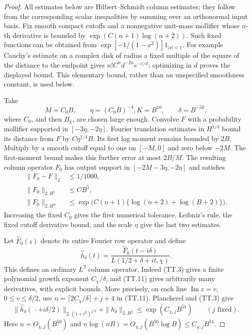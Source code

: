 \begin{proof}
All estimates below are Hilbert--Schmidt column estimates;
they follow from the corresponding scalar inequalities by
summing over an orthonormal input basis.
Fix smooth compact cutoffs and a nonnegative unit-mass
mollifier whose \(n\)-th derivative is bounded by
\(\exp(C(n+1)\log(n+2))\).
Such fixed functions can be obtained from
\(\exp[-1/(1-x^2)]1_{|x|<1}\).
For example Cauchy's estimate on a complex disk of radius
a fixed multiple of the square of the distance to the
endpoint gives \(n!C^n d^{-2n}e^{-c/d}\);
optimizing in \(d\) proves the displayed bound.
This elementary bound, rather than an unspecified
smoothness constant, is used below.

Take
\[
       M=C_0B,\qquad \eta=(C_0B)^{-4},
                         K=B^{10},\qquad\delta=B^{-50},
 \tag{TT.10}
\]
where \(C_0\), and then \(B_\chi\), are chosen large enough.
Convolve \(F\) with a probability mollifier supported in
\([-3\eta,-2\eta]\).
Fourier translation estimates in \(H^{1/4}\) bound its
distance from \(F\) by \(C\eta^{1/4}B\).
Its first log moment remains bounded by \(2B\).
Multiply by a smooth cutoff equal to one on \([-M,0]\)
and zero below \(-2M\).
The first-moment bound makes this further error at most
\(2B/M\).
The resulting column operator \(F_0\) has output support
in \([-2M-3\eta,-2\eta]\) and satisfies
\[
 \begin{split}
 \|F_0-F\|_2&\leq1/1000,\\
 \|F_0\|_{2,H^1}&\leq C B^5,\\
 \|F_0\|_{2,H^n}
      &\leq \exp\!\bigl(C(n+1)
                       \{\log(n+2)+\log(B+2)\}\bigr).
 \end{split}
 \tag{TT.11}
\]
Increasing the fixed \(C_0\) gives the first numerical
tolerance.  Leibniz's rule, the fixed cutoff derivative
bound, and the scale \(\eta\) give the last two estimates.

Let \(\widehat F_0(z)\) denote its entire Fourier row
operator and define
\[
        \widehat h_\delta(t)
          =\frac{\widehat F_0(t-i\delta)}
                         {L(1/2+\delta+it,\chi)} .
 \tag{TT.12}
\]
This defines an ordinary \(L^2\) column operator.
Indeed (TT.3) gives a finite polynomial growth exponent
\(C_\chi/\delta\), and (TT.11) gives arbitrarily many
derivatives, with explicit bounds.
More precisely, on each line
\(\operatorname{Im}z=v\), \(0\leq v\leq\delta/2\),
use \(n=\lceil 2C_\chi/\delta\rceil+j+4\) in (TT.11).
Plancherel and (TT.3) give
\[
 \|\widehat h_\delta(\,\cdot+i\delta/2)\|
                _{2,(1+t^2)^{j/2}}
             +\|h_\delta\|_{2,H^j}
                 \leq \exp(C_{\chi,j}B^{51})
                  \qquad(j\text{ fixed}).
 \tag{TT.13}
\]
Here \(n=O_{\chi,j}(B^{50})\) and
\(n\log(nB)=O_{\chi,j}(B^{50}\log B)\leq C_{\chi,j}B^{51}\).


\end{proof}
